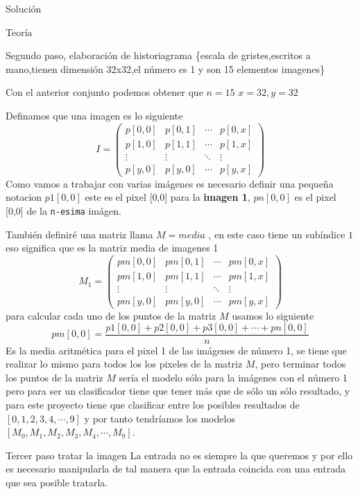 \documentclass[
  spanish,
  ignorenonframetext,
]{beamer}
\begin{document}
\begin{frame}[fragile]{Solución}
\begin{block}{Teoría}
\begin{block}{Segundo paso, elaboración de historiagrama}
\{escala de gristes,escritos a mano,tienen dimensión 32x32,el número es
1 y son 15 elementos imagenes\}

Con el anterior conjunto podemos obtener que \(n=15\) \(x=32,y=32\)

Definamos que una imagen es lo siguiente \[
I=
\begin{equation}
\begin{pmatrix}
p[0,0] & p[0,1] & \cdots & p[0,x]\\
p[1,0] & p[1,1] & \cdots & p[1,x]\\
\vdots & \vdots & \ddots & \vdots\\
p[y,0] & p[y,0] & \cdots & p[y,x]
\end{pmatrix}
\end{equation}
\] Como vamos a trabajar con varias imágenes es necesario definir una
pequeña notacion \(p1[0,0]\) este es el pixel {[}0,0{]} para la
\textbf{imagen 1}, \(pn[0,0]\) es el pixel {[}0,0{]} de la
\texttt{n-esima} imágen.

También definiré una matriz llama \(M=media\) , en este caso tiene un
subíndice \(1\) eso significa que es la matriz media de imagenes 1 \[
M_1= \begin{equation}
\begin{pmatrix}
pm[0,0] & pm[0,1] & \cdots & pm[0,x]\\
pm[1,0] & pm[1,1] & \cdots & pm[1,x]\\
\vdots & \vdots & \ddots & \vdots\\
pm[y,0] & pm[y,0] & \cdots & pm[y,x]
\end{pmatrix}
\end{equation}
\] para calcular cada uno de los puntos de la matriz \(M\) usamos lo
siguiente \[
pm[0,0]= \frac{p1[0,0]+ p2[0,0] + p3[0,0]+ \cdots + pn[0,0]}{n}
\] Es la media aritmética para el pixel 1 de las imágenes de número 1,
se tiene que realizar lo mismo para todos los los pixeles de la matriz
\(M\), pero terminar todos los puntos de la matriz \(M\) sería el modelo
sólo para la imágenes con el número 1 pero para ser un clasificador
tiene que tener más que de sólo un sólo resultado, y para este proyecto
tiene que clasificar entre los posibles resultados de
\([0,1,2,3,4,\cdots,9]\) y por tanto tendríamos los modelos
\([M_0,M_1,M_2,M_3,M_4,\cdots,M_9]\).
\end{block}

\begin{block}{Tercer paso tratar la imagen}
\protect\hypertarget{tercer-paso-tratar-la-imagen}{}
La entrada no es siempre la que queremos y por ello es necesario
manipularla de tal manera que la entrada coincida con una entrada que
sea posible tratarla.


\end{block}
\end{block}
\end{frame}
\end{document}
